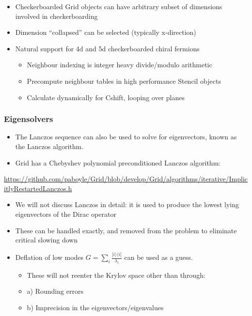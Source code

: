 \documentclass[pdf,ps,8pt]{beamer}
\newcommand{\link}[1]{\href{#1}{ {\color{blue} #1} }}
\begin{document}
\begin{frame}[fragile]
\begin{center}
\end{center}
\begin{itemize}
\item Checkerboarded Grid objects can have arbitrary subset of dimensions involved in checkerboarding
\item Dimension ``collapsed'' can be selected (typically x-direction)
\item Natural support for 4d and 5d checkerboarded chiral fermions  
\begin{itemize}
  \item Neighbour indexing is integer heavy divide/modulo arithmetic
  \item Precompute neighbour tables in high performance Stencil objects
  \item Calculate dynamically for Cshift, looping over planes
\end{itemize}
\end{itemize}
\end{frame}

  \begin{frame}[fragile]\small\frametitle{ Eigensolvers}
\begin{itemize}
\item   The Lanczos sequence can also be used to solve for eigenvectors, known as the Lanczos algorithm.
\item   Grid has a Chebyshev polynomial preconditioned Lanczos algorithm:
\end{itemize}
\link{https://github.com/paboyle/Grid/blob/develop/Grid/algorithms/iterative/ImplicitlyRestartedLanczos.h}
\begin{itemize}
\item We will not discuss Lanczos in detail: it is used to produce the lowest lying eigenvectors of the Dirac operator
\item These can be handled exactly, and removed from the problem to eliminate critical slowing down
\item Deflation of low modes $G = \sum_i  \frac{|i\rangle\langle i|}{\lambda_i}  $ can be used as a guess.\\
\begin{itemize}
\item      These will not reenter the Krylov space other than through:
\item a) Rounding errors
\item b) Imprecision in the eigenvectors/eigenvalues
\end{itemize}
\end{itemize}
  \end{frame}
\end{document}
